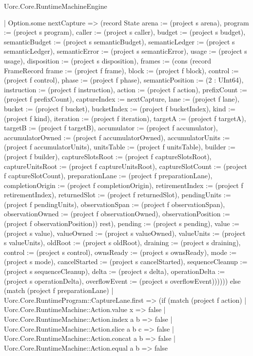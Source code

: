 \begin{lexlean}{Uorc.Core.RuntimeMachineEngine}
\begin{semanticmodule}
{            | Option.some nextCapture => (record State {arena := (project s arena), program := (project s program), caller := (project s caller), budget := (project s budget), semanticBudget := (project s semanticBudget), semanticLedger := (project s semanticLedger), semanticError := (project s semanticError), usage := (project s usage), disposition := (project s disposition), frames := (cons (record FrameRecord {frame := (project f frame), block := (project f block), control := (project f control), phase := (project f phase), semanticPosition := (2 : UInt64), instruction := (project f instruction), action := (project f action), prefixCount := (project f prefixCount), captureIndex := nextCapture, lane := (project f lane), bucket := (project f bucket), bucketIndex := (project f bucketIndex), kind := (project f kind), iteration := (project f iteration), targetA := (project f targetA), targetB := (project f targetB), accumulator := (project f accumulator), accumulatorOwned := (project f accumulatorOwned), accumulatorUnits := (project f accumulatorUnits), unitsTable := (project f unitsTable), builder := (project f builder), captureSlotsRoot := (project f captureSlotsRoot), captureUnitsRoot := (project f captureUnitsRoot), captureSlotCount := (project f captureSlotCount), preparationLane := (project f preparationLane), completionOrigin := (project f completionOrigin), retirementIndex := (project f retirementIndex), returnedSlot := (project f returnedSlot), pendingUnits := (project f pendingUnits), observationSpan := (project f observationSpan), observationOwned := (project f observationOwned), observationPosition := (project f observationPosition)}) rest), pending := (project s pending), value := (project s value), valueOwned := (project s valueOwned), valueUnits := (project s valueUnits), oldRoot := (project s oldRoot), draining := (project s draining), control := (project s control), ownsReady := (project s ownsReady), mode := (project s mode), cancelStarted := (project s cancelStarted), sequenceCleanup := (project s sequenceCleanup), delta := (project s delta), operationDelta := (project s operationDelta), overflowEvent := (project s overflowEvent)}))))) else (match (project f preparationLane)
        | Uorc.Core.RuntimeProgram::CaptureLane.first => (if (match (project f action)
          | Uorc.Core.RuntimeMachine::Action.value x => false
          | Uorc.Core.RuntimeMachine::Action.index a b => false
          | Uorc.Core.RuntimeMachine::Action.slice a b c => false
          | Uorc.Core.RuntimeMachine::Action.concat a b => false
          | Uorc.Core.RuntimeMachine::Action.equal a b => false
}
\end{semanticmodule}
\end{lexlean}
